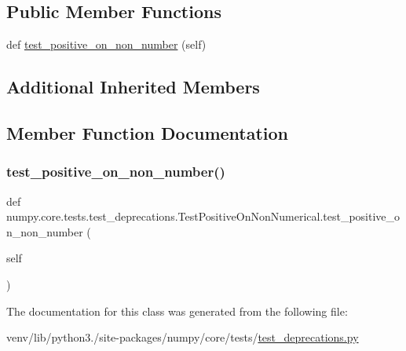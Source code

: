 \subsection*{Public Member Functions}
\begin{DoxyCompactItemize}
\item 
def \hyperlink{classnumpy_1_1core_1_1tests_1_1test__deprecations_1_1TestPositiveOnNonNumerical_adbde5797fc5f1c0c38b8d51cc3e6a080}{test\+\_\+positive\+\_\+on\+\_\+non\+\_\+number} (self)
\end{DoxyCompactItemize}
\subsection*{Additional Inherited Members}


\subsection{Member Function Documentation}
\mbox{\label{classnumpy_1_1core_1_1tests_1_1test__deprecations_1_1TestPositiveOnNonNumerical_adbde5797fc5f1c0c38b8d51cc3e6a080}} 
\subsubsection{\texorpdfstring{test\+\_\+positive\+\_\+on\+\_\+non\+\_\+number()}{test\_positive\_on\_non\_number()}}
{\footnotesize\ttfamily def numpy.\+core.\+tests.\+test\+\_\+deprecations.\+Test\+Positive\+On\+Non\+Numerical.\+test\+\_\+positive\+\_\+on\+\_\+non\+\_\+number (\begin{DoxyParamCaption}\item[{}]{self }\end{DoxyParamCaption})}



The documentation for this class was generated from the following file\+:\begin{DoxyCompactItemize}
\item 
venv/lib/python3./site-\/packages/numpy/core/tests/\hyperlink{core_2tests_2test__deprecations_8py}{test\+\_\+deprecations.\+py}\end{DoxyCompactItemize}
